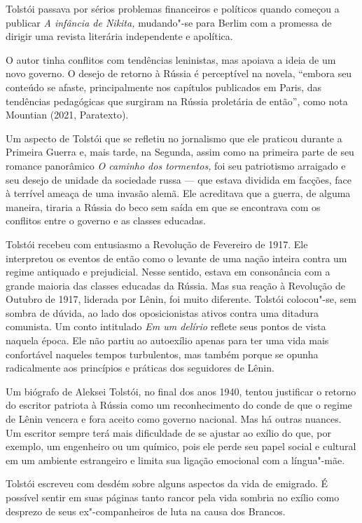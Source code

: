 \documentclass{article}
\begin{document}
Tolstói passava por sérios problemas financeiros e políticos quando
começou a publicar \emph{A infância de Nikita,} mudando"-se para Berlim
com a promessa de dirigir uma revista literária independente e
apolítica.

O autor tinha conflitos com tendências leninistas, mas apoiava a ideia
de um novo governo. O desejo de retorno à Rússia é perceptível na
novela, ``embora seu conteúdo se afaste, principalmente nos capítulos
publicados em Paris, das tendências pedagógicas que surgiram na Rússia
proletária de então'', como nota Mountian (2021, Paratexto).

Um aspecto de Tolstói que se refletiu no jornalismo que ele praticou
durante a Primeira Guerra e, mais tarde, na Segunda, assim como na
primeira parte de seu romance panorâmico \emph{O caminho dos tormentos,}
foi seu patriotismo arraigado e seu desejo de unidade da sociedade russa
--- que estava dividida em facções, face à terrível ameaça de uma
invasão alemã. Ele acreditava que a guerra, de alguma maneira, tiraria a
Rússia do beco sem saída em que se encontrava com os conflitos entre o
governo e as classes educadas.

Tolstói recebeu com entusiasmo a Revolução de Fevereiro de 1917. Ele
interpretou os eventos de então como o levante de uma nação inteira
contra um regime antiquado e prejudicial. Nesse sentido, estava em
consonância com a grande maioria das classes educadas da Rússia. Mas sua
reação à Revolução de Outubro de 1917, liderada por Lênin, foi muito
diferente. Tolstói colocou"-se, sem sombra de dúvida, ao lado dos
oposicionistas ativos contra uma ditadura comunista. Um conto intitulado
\emph{Em um delírio} reflete seus pontos de vista naquela época. Ele não
partiu ao autoexílio apenas para ter uma vida mais confortável naqueles
tempos turbulentos, mas também porque se opunha radicalmente aos
princípios e práticas dos seguidores de Lênin.

Um biógrafo de Aleksei Tolstói, no final dos anos 1940, tentou
justificar o retorno do escritor patriota à Rússia como um
reconhecimento do conde de que o regime de Lênin vencera e fora aceito
como governo nacional. Mas há outras nuances. Um escritor sempre terá
mais dificuldade de se ajustar ao exílio do que, por exemplo, um
engenheiro ou um químico, pois ele perde seu papel social e cultural em
um ambiente estrangeiro e limita sua ligação emocional com a língua"-mãe.

Tolstói escreveu com desdém sobre alguns aspectos da vida de emigrado. É
possível sentir em suas páginas tanto rancor pela vida sombria no exílio
como desprezo de seus ex"-companheiros de luta na causa dos Brancos.
\end{document}
